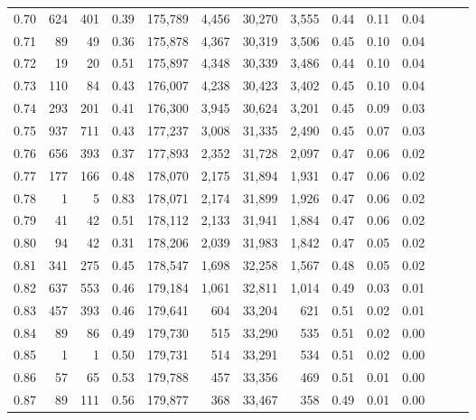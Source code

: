 \begin{tabular}{rrrrrrrrrrrrrr}
0.70 &     624 &    401 &  0.39 &  175,789 &    4,456 &  30,270 &   3,555 &  0.44 &  0.11 &      0.04 \\
0.71 &      89 &     49 &  0.36 &  175,878 &    4,367 &  30,319 &   3,506 &  0.45 &  0.10 &      0.04 \\
0.72 &      19 &     20 &  0.51 &  175,897 &    4,348 &  30,339 &   3,486 &  0.44 &  0.10 &      0.04 \\
0.73 &     110 &     84 &  0.43 &  176,007 &    4,238 &  30,423 &   3,402 &  0.45 &  0.10 &      0.04 \\
0.74 &     293 &    201 &  0.41 &  176,300 &    3,945 &  30,624 &   3,201 &  0.45 &  0.09 &      0.03 \\
0.75 &     937 &    711 &  0.43 &  177,237 &    3,008 &  31,335 &   2,490 &  0.45 &  0.07 &      0.03 \\
0.76 &     656 &    393 &  0.37 &  177,893 &    2,352 &  31,728 &   2,097 &  0.47 &  0.06 &      0.02 \\
0.77 &     177 &    166 &  0.48 &  178,070 &    2,175 &  31,894 &   1,931 &  0.47 &  0.06 &      0.02 \\
0.78 &       1 &      5 &  0.83 &  178,071 &    2,174 &  31,899 &   1,926 &  0.47 &  0.06 &      0.02 \\
0.79 &      41 &     42 &  0.51 &  178,112 &    2,133 &  31,941 &   1,884 &  0.47 &  0.06 &      0.02 \\
0.80 &      94 &     42 &  0.31 &  178,206 &    2,039 &  31,983 &   1,842 &  0.47 &  0.05 &      0.02 \\
0.81 &     341 &    275 &  0.45 &  178,547 &    1,698 &  32,258 &   1,567 &  0.48 &  0.05 &      0.02 \\
0.82 &     637 &    553 &  0.46 &  179,184 &    1,061 &  32,811 &   1,014 &  0.49 &  0.03 &      0.01 \\
0.83 &     457 &    393 &  0.46 &  179,641 &      604 &  33,204 &     621 &  0.51 &  0.02 &      0.01 \\
0.84 &      89 &     86 &  0.49 &  179,730 &      515 &  33,290 &     535 &  0.51 &  0.02 &      0.00 \\
0.85 &       1 &      1 &  0.50 &  179,731 &      514 &  33,291 &     534 &  0.51 &  0.02 &      0.00 \\
0.86 &      57 &     65 &  0.53 &  179,788 &      457 &  33,356 &     469 &  0.51 &  0.01 &      0.00 \\
0.87 &      89 &    111 &  0.56 &  179,877 &      368 &  33,467 &     358 &  0.49 &  0.01 &      0.00 \\

\end{tabular}

